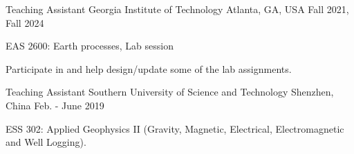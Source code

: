 

\begin{cventries}

  \cventry
    {Teaching Assistant} %
    {Georgia Institute of Technology} %
    {Atlanta, GA, USA} %
    {Fall 2021, Fall 2024} %
    {
      \begin{cvitems} %
        \item {EAS 2600: Earth processes, Lab session}
        \item Participate in and help design/update some of the lab assignments.
      \end{cvitems}
    }


  \cventry
    {Teaching Assistant} %
    {Southern University of Science and Technology} %
    {Shenzhen, China} %
    {Feb. - June 2019} %
    {
      \begin{cvitems} %
        \item {ESS 302: Applied Geophysics II (Gravity, Magnetic, Electrical, Electromagnetic and Well Logging).}
      \end{cvitems}
    }

\end{cventries}
